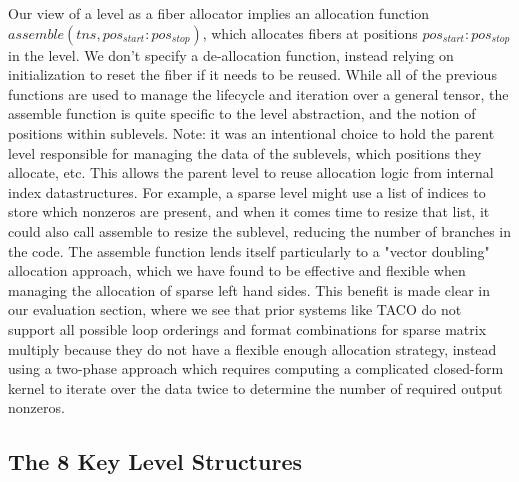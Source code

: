 Our view of a level as a fiber allocator implies an allocation function
$assemble(tns, pos_{start}:pos_{stop})$, which allocates fibers at positions
$pos_{start}:pos_{stop}$ in the level. We don't specify a de-allocation
function, instead relying on initialization to reset the fiber if it needs to be
reused. While all of the previous functions are used to manage the lifecycle and
iteration over a general tensor, the assemble function is quite specific to the
level abstraction, and the notion of positions within sublevels. Note: it was an
intentional choice to hold the parent level responsible for managing the
data of the sublevels, which positions they allocate, etc. This allows the parent
level to reuse allocation logic from internal index datastructures. For example,
a sparse level might use a list of indices to store which nonzeros are present,
and when it comes time to resize that list, it could also call assemble to resize the
sublevel, reducing the number of branches in the code. The assemble function
lends itself particularly to a "vector doubling" allocation approach, which we
have found to be effective and flexible when managing the allocation
of sparse left hand sides. This benefit is made clear in our evaluation section,
where we see that prior systems like TACO do not support all possible loop
orderings and format combinations for sparse matrix multiply because they do
not have a flexible enough allocation strategy, instead using a two-phase approach
which requires computing a complicated closed-form kernel to iterate over the
data twice to determine the number of required output nonzeros.

\subsection{The 8 Key Level Structures}

